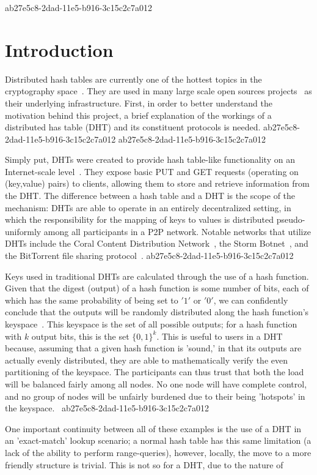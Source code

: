 \documentclass[12pt]{article}
\begin{document}
ab27e5c8-2dad-11e5-b916-3c15c2c7a012\section{Introduction}
\par Distributed hash tables are currently one of the hottest topics in the cryptography space~\cite{Stoica:2001dj,Rowstron:2001ea,Ratnasamy:2001wn}. They are used in many large scale open sources projects~\cite{Freitas:2013tb,Xu:2010vs,Perfitt:2010fh} as their underlying infrastructure. First, in order to better understand the motivation behind this project, a brief explanation of the workings of a distributed has table (DHT) and its constituent protocols is needed.
ab27e5c8-2dad-11e5-b916-3c15c2c7a012
ab27e5c8-2dad-11e5-b916-3c15c2c7a012\par Simply put, DHTs were created to provide hash table-like functionality on an Internet-scale level~\cite{Ratnasamy:2001wn}. They expose basic PUT and GET requests (operating on (key,value) pairs) to clients, allowing them to store and retrieve information from the DHT. The difference between a hash table and a DHT is the scope of the mechanism: DHTs are able to operate in an entirely decentralized setting, in which the responsibility for the mapping of keys to values is distributed pseudo-uniformly among all participants in a P2P network. Notable networks that utilize DHTs include the Coral Content Distribution Network~\cite{Freedman:2004vb}, the Storm Botnet~\cite{Holz:2008uk}, and the BitTorrent file sharing protocol~\cite{Cohen:y1_8mBnw}.
ab27e5c8-2dad-11e5-b916-3c15c2c7a012
\par Keys used in traditional DHTs are calculated through the use of a hash function. Given that the digest (output) of a hash function is some number of bits, each of which has the same probability of being set to $'1'$ or $'0'$, we can confidently conclude that the outputs will be randomly distributed along the hash function's keyspace~. This keyspace is the set of all possible outputs; for a hash function with $k$ output bits, this is the set $\{0,1\}^k$. This is useful to users in a DHT because, assuming that a given hash function is 'sound,' in that its outputs are actually evenly distributed, they are able to mathematically verify the even partitioning of the keyspace. The participants can thus trust that both the load will be balanced fairly among all nodes. No one node will have complete control, and no group of nodes will be unfairly burdened due to their being 'hotspots' in the keyspace.~
ab27e5c8-2dad-11e5-b916-3c15c2c7a012
\par One important continuity between all of these examples is the use of a DHT in an 'exact-match' lookup scenario; a normal hash table has this same limitation (a lack of the ability to perform range-queries), however, locally, the move to a more friendly structure is trivial. This is not so for a DHT, due to the nature of
\printbibliography
\end{document}
